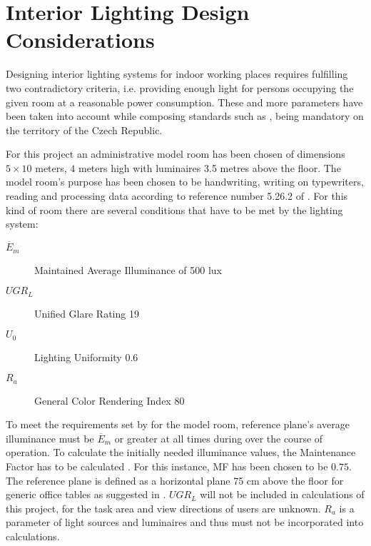\section{Interior Lighting Design Considerations} \label{sec:design}
Designing interior lighting systems for indoor working places requires fulfilling two contradictory criteria, i.e. providing enough light for persons occupying the given room at a reasonable power consumption. These and more parameters have been taken into account while composing standards such as \cite{12464}, being mandatory on the territory of the Czech Republic.

For this project an administrative model room has been chosen of dimensions $5 \times 10 $ meters, $4$ meters high with luminaires 3.5 metres above the floor. The model room's purpose has been chosen to be handwriting, writing on typewriters, reading and processing data according to reference number 5.26.2 of \cite{12464}. For this kind of room there are several conditions that have to be met by the lighting system:

\begin{description}
	\item[$\overline{E}_{m}$] Maintained Average Illuminance of 500 lux
	\item[$UGR_{L}$] Unified Glare Rating 19
	\item[$U_{0}$] Lighting Uniformity 0.6
	\item[$R_{a}$] General Color Rendering Index 80
\end{description}

To meet the requirements set by \cite{12464} for the model room, reference plane's average illuminance must be $\overline{E}_{m}$ or greater at all times during over the course of operation. To calculate the initially needed illuminance values, the Maintenance Factor has to be calculated \cite{CIE97}. For this instance, MF has been chosen to be $0.75$. The reference plane is defined as a horizontal plane 75 cm above the floor for generic office tables as suggested in \cite{12464}. $UGR_{L}$ will not be included in calculations of this project, for the task area and view directions of users are unknown. $R_{a}$ is a parameter of light sources and luminaires and thus must not be incorporated into calculations.
